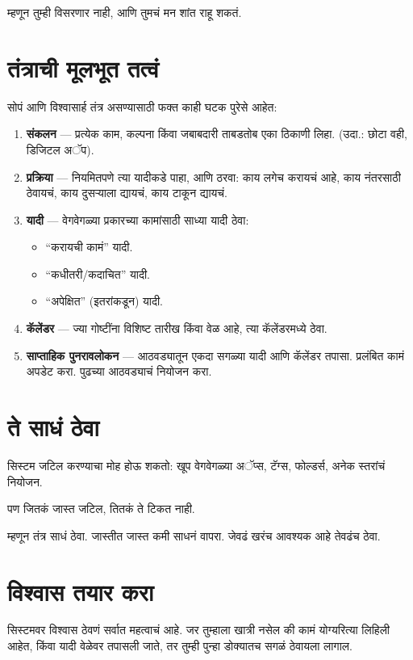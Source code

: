 म्हणून तुम्ही विसरणार नाही,  
आणि तुमचं मन शांत राहू शकतं.  

\section*{तंत्राची मूलभूत तत्वं}
सोपं आणि विश्वासार्ह तंत्र असण्यासाठी फक्त काही घटक पुरेसे आहेत:  

\begin{enumerate}
\item \textbf{संकलन} —  
प्रत्येक काम, कल्पना किंवा जबाबदारी  
ताबडतोब एका ठिकाणी लिहा.  
(उदा.: छोटा वही, डिजिटल अॅप).  

\item \textbf{प्रक्रिया} —  
नियमितपणे त्या यादीकडे पाहा,  
आणि ठरवा:  
काय लगेच करायचं आहे,  
काय नंतरसाठी ठेवायचं,  
काय दुसऱ्याला द्यायचं,  
काय टाकून द्यायचं.  

\item \textbf{यादी} —  
वेगवेगळ्या प्रकारच्या कामांसाठी साध्या यादी ठेवा:  
\begin{itemize}
\item “करायची कामं” यादी.  
\item “कधीतरी/कदाचित” यादी.  
\item “अपेक्षित” (इतरांकडून) यादी.  
\end{itemize}

\item \textbf{कॅलेंडर} —  
ज्या गोष्टींना विशिष्ट तारीख किंवा वेळ आहे,  
त्या कॅलेंडरमध्ये ठेवा.  

\item \textbf{साप्ताहिक पुनरावलोकन} —  
आठवड्यातून एकदा सगळ्या यादी आणि कॅलेंडर तपासा.  
प्रलंबित कामं अपडेट करा.  
पुढच्या आठवड्याचं नियोजन करा.  
\end{enumerate}

\section*{ते साधं ठेवा}
सिस्टम जटिल करण्याचा मोह होऊ शकतो:  
खूप वेगवेगळ्या अॅप्स, टॅग्स, फोल्डर्स,  
अनेक स्तरांचं नियोजन.  

पण जितकं जास्त जटिल,  
तितकं ते टिकत नाही.  

म्हणून तंत्र साधं ठेवा.  
जास्तीत जास्त कमी साधनं वापरा.  
जेवढं खरंच आवश्यक आहे तेवढंच ठेवा.  

\section*{विश्वास तयार करा}
सिस्टमवर विश्वास ठेवणं सर्वात महत्वाचं आहे.  
जर तुम्हाला खात्री नसेल की कामं योग्यरित्या लिहिली आहेत,  
किंवा यादी वेळेवर तपासली जाते,  
तर तुम्ही पुन्हा डोक्यातच सगळं ठेवायला लागाल.  

